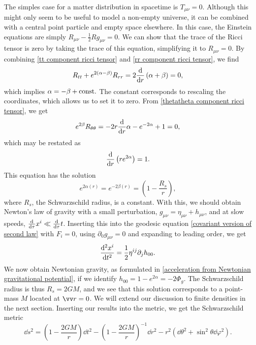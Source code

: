 The simples case for a matter distribution in spacetime is $T_{\mu \nu} = 0$.
Although this might only seem to be useful to model a non-empty universe, it can be combined with a central point particle and empty space elsewhere.
In this case, the Einstein equations are simply $R_{\mu \nu} - \frac{1}{2}R g_{\mu \nu} = 0$.
We can show that the trace of the Ricci tensor is zero by taking the trace of this equation, simplifying it to $R_{\mu \nu} = 0$.
By combining \autoref{tt component ricci tensor} and \autoref{rr component ricci tensor}, we find
%
\begin{equation}
    R_{tt} + e^{2(\alpha - \beta)}R_{rr} = 2 \odv{}{r} \left(\alpha + \beta\right) = 0,
\end{equation}
%
which implies $\alpha = -\beta + \mathrm{const.}$
The constant corresponds to rescaling the coordinates, which allows us to set it to zero.
From \autoref{thetatheta component ricci tensor}, we get
%
\begin{equation}
    e^{2 \beta} R_{\theta \theta} = - 2 r\odv{}{r} \alpha - e^{-2\alpha} + 1 = 0,
\end{equation}
%
which may be restated as
%
\begin{equation}
    \odv{}{r} \left(r e^{2 \alpha}\right) = 1.
\end{equation}
%
This equation has the solution
%
\begin{equation}
    e^{2\alpha(r)} = e^{-2 \beta(r)} = \left( 1- \frac{R_s}{r} \right),
\end{equation}
%
where $R_s$, the Schwarzschild radius, is a constant.
With this, we should obtain Newton's law of gravity with a small perturbation, $g_{\mu \nu} = \eta_{\mu \nu} + h_{\mu \nu}$, and at slow speeds, $\odv*{x^i}{\tau} \ll \odv*{t}{\tau}$.
Inserting this into the geodesic equation \autoref{covariant version of second law} with $F_i = 0$, using $\partial_0 g_{\mu \nu} = 0$ and expanding to leading order, we get
%
\begin{equation}
    \odv[2]{x^i}{t} = \frac{1}{2}\eta^{i j}\partial_j h_{00}.
\end{equation}
%
We now obtain Newtonian gravity, as formulated in \autoref{acceleration from Newtonian gravitational potential}, if we identify $h_{00} = 1 -  e^{2\alpha} = - 2 \Phi_g$.
The Schwarzschild radius is thus $R_s = 2 G M$, and we see that this solution corresponds to a point-mass $M$ located at $\vv r = 0$.
We will extend our discussion to finite densities in the next section.
Inserting our results into the metric, we get the Schwarzschild metric
%
\begin{equation}
    \label{Schwarzchild metric}
    \dd s^2 
    = 
    \left( 1 - \frac{2 G M}{r} \right) \dd t^2
    -\left( 1 - \frac{2 G M}{r} \right)^{-1} \dd r^2
    - r^2 \left(\dd \theta^2 + \sin^2 \theta \dd \varphi^2\right).
\end{equation}
%





